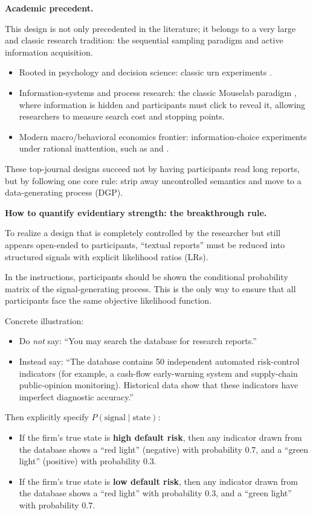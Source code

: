 \textbf{Academic precedent.}

This design is not only precedented in the literature; it belongs to a very large and classic research tradition: the sequential sampling paradigm and active information acquisition.
\begin{itemize}[leftmargin=1.5em]
\item Rooted in psychology and decision science: classic urn experiments \citep{Edwards1965}.
\item Information-systems and process research: the classic Mouselab paradigm \citep{PayneBettmanJohnson1993}, where information is hidden and participants must click to reveal it, allowing researchers to measure search cost and stopping points.
\item Modern macro/behavioral economics frontier: information-choice experiments under rational inattention, such as \citet{CaplinDean2015} and \citet{EnkeZimmermann2019}.
\end{itemize}

These top-journal designs succeed not by having participants read long reports, but by following one core rule: strip away uncontrolled semantics and move to a data-generating process (DGP).

\textbf{How to quantify evidentiary strength: the breakthrough rule.}

To realize a design that is completely controlled by the researcher but still appears open-ended to participants, ``textual reports'' must be reduced into structured signals with explicit likelihood ratios (LRs).

In the instructions, participants should be shown the conditional probability matrix of the signal-generating process. This is the only way to ensure that all participants face the same objective likelihood function.

Concrete illustration:
\begin{itemize}[leftmargin=1.5em]
\item Do \emph{not} say: ``You may search the database for research reports.''
\item Instead say: ``The database contains 50 independent automated risk-control indicators (for example, a cash-flow early-warning system and supply-chain public-opinion monitoring). Historical data show that these indicators have imperfect diagnostic accuracy.''
\end{itemize}

Then explicitly specify \(P(\text{signal} \mid \text{state})\):
\begin{itemize}[leftmargin=1.5em]
\item If the firm's true state is \textbf{high default risk}, then any indicator drawn from the database shows a ``red light'' (negative) with probability \(0.7\), and a ``green light'' (positive) with probability \(0.3\).
\item If the firm's true state is \textbf{low default risk}, then any indicator drawn from the database shows a ``red light'' with probability \(0.3\), and a ``green light'' with probability \(0.7\).
\end{itemize}

